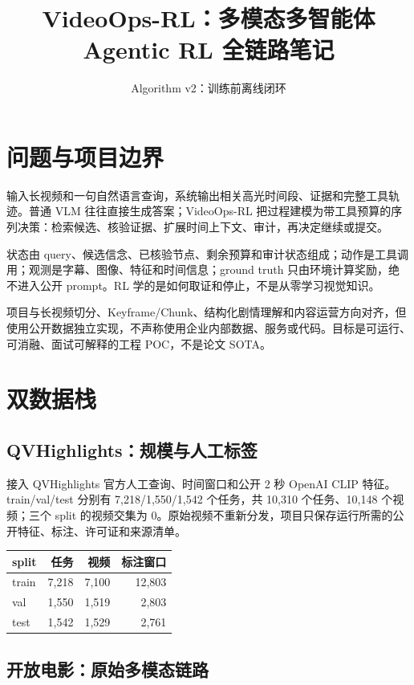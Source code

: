 \documentclass[UTF8,letterpaper,10pt,twocolumn]{ctexart}
\title{\bfseries VideoOps-RL：多模态多智能体 Agentic RL 全链路笔记}
\author{}
\date{Algorithm v2：训练前离线闭环}
\begin{document}
\maketitle
\pagestyle{plain}
\small

\section{问题与项目边界}

输入长视频和一句自然语言查询，系统输出相关高光时间段、证据和完整工具轨迹。普通 VLM 往往直接生成答案；VideoOps-RL 把过程建模为带工具预算的序列决策：检索候选、核验证据、扩展时间上下文、审计，再决定继续或提交。

状态由 query、候选信念、已核验节点、剩余预算和审计状态组成；动作是工具调用；观测是字幕、图像、特征和时间信息；ground truth 只由环境计算奖励，绝不进入公开 prompt。RL 学的是如何取证和停止，不是从零学习视觉知识。

项目与长视频切分、Keyframe/Chunk、结构化剧情理解和内容运营方向对齐，但使用公开数据独立实现，不声称使用企业内部数据、服务或代码。目标是可运行、可消融、面试可解释的工程 POC，不是论文 SOTA。

\section{双数据栈}

\subsection{QVHighlights：规模与人工标签}

接入 QVHighlights 官方人工查询、时间窗口和公开 2 秒 OpenAI CLIP 特征。train/val/test 分别有 7,218/1,550/1,542 个任务，共 10,310 个任务、10,148 个视频；三个 split 的视频交集为 0。原始视频不重新分发，项目只保存运行所需的公开特征、标注、许可证和来源清单。

\begin{center}
\begin{tabular}{lrrr}
\toprule
split & 任务 & 视频 & 标注窗口\\
\midrule
train & 7,218 & 7,100 & 12,803\\
val & 1,550 & 1,519 & 2,803\\
test & 1,542 & 1,529 & 2,761\\
\bottomrule
\end{tabular}
\end{center}

\subsection{开放电影：原始多模态链路}
\end{document}
